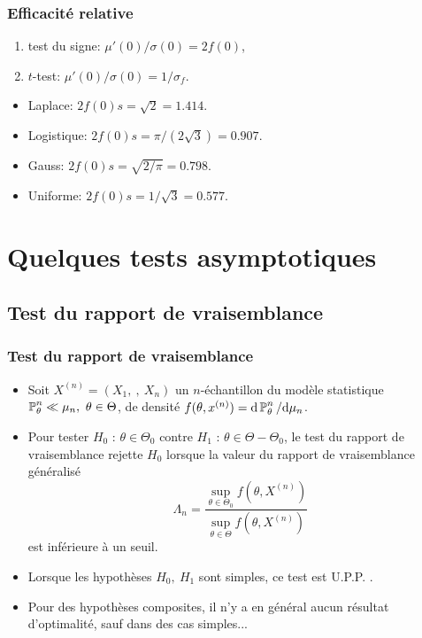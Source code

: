 \begin{frame}
\frametitle{Efficacité relative}
\begin{enumerate}
\item test du signe: $\mu'(0)/\sigma(0)=2 f(0)$,
\item $t$-test: $\mu'(0)/\sigma(0)=1/\sigma_f$.
\end{enumerate}

\begin{itemize}
\item Laplace: $2 f(0) s = \sqrt{2}=1.414$.
\item Logistique: $2 f(0) s = \pi/(2\sqrt{3})=0.907$.
\item Gauss: $2 f(0) s = \sqrt{2/\pi}=0.798$.
\item Uniforme: $2 f(0) s = 1/\sqrt{3}=0.577$.
\end{itemize}
\end{frame}

\section{Quelques tests asymptotiques}

\subsection{Test du rapport de vraisemblance}
\begin{frame}
\frametitle{Test du rapport de vraisemblance}
 \begin{itemize}
 \item Soit  $X^{(n)}= (X_{1},\ ,\ X_{n})$ un $n$-échantillon du modèle statistique $\PP_{\theta}^{n}\ll\mu_{n},\ \theta\in\Theta$, de densité  $f(\theta,x^{(n)})= \mathrm{d} \operatorname{{\mathbb P}}_{\theta}^{n}/ \mathrm{d} \mu_{n}$.
 \item Pour tester $H_{0}$ : $\theta\in\Theta_{0}$  contre $H_{1}$ : $\theta\in\Theta-\Theta_{0}$, le test du \alert{rapport de vraisemblance} rejette $H_{0}$ lorsque la valeur du \alert{rapport de vraisemblance généralisé}
$$
\Lambda_{n}=\frac{\sup_{\theta\in\Theta_{0}}f(\theta,X^{(n)})}{\sup_{\theta\in\Theta}f(\theta,X^{(n)})}
$$
est inférieure à un seuil.
\item   Lorsque les hypothèses $H_{0},\ H_{1}$ sont simples, ce test est U.P.P. .
\item Pour des hypothèses composites, il n'y a en général aucun résultat d'optimalité, sauf dans des cas simples...
\end{itemize}
\end{frame}

